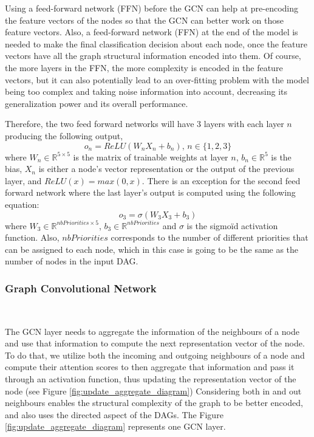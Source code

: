 Using a feed-forward network (FFN) before the GCN can help at pre-encoding the feature vectors of the nodes
so that the GCN can better work on those feature vectors.
Also, a feed-forward network (FFN) at the end of the model is needed to make 
the final classification decision about each node, once the feature vectors have
all the graph structural information encoded into them.
Of course, the more layers in the FFN, the more complexity
is encoded in the feature vectors, but it can also potentially lead to an over-fitting
problem with the model being too complex and taking noise information into account,
decreasing its generalization power and its overall performance.

Therefore, the two feed forward networks will have 3 layers with each 
layer $n$ producing the following output,
\begin{equation}
    o_{n} = ReLU(W_{n}X_{n} + b_n),\, n \in \{1,2,3\}
\end{equation}
where $W_n \in \mathbb{R}^{5\times5}$ is the matrix of trainable weights
at layer $n$, $b_n \in \mathbb{R}^5$ is the bias, $X_n$ is either a node's vector representation
or the output of the previous layer, and $ReLU(x) = max(0, x)$.
There is an exception for the second feed forward network where the last 
layer's output is computed using the following equation:
\begin{equation}
    o_{3} = \sigma(W_{3}X_{3} + b_3)
\end{equation}
where $W_3 \in \mathbb{R}^{nbPriorities \times 5}$,
$b_3 \in \mathbb{R}^{nbPriorities}$ and $\sigma$ is the 
sigmoïd activation function.
Also, $nbPriorities$ corresponds to the number of different priorities
that can be assigned to each node, which in this case is going to be the same as the number of nodes in the input DAG.


\subsubsection{Graph Convolutional Network}
~

The GCN layer needs to aggregate the information 
of the neighbours of a node and use that information
to compute the next representation vector of the node.
To do that, we utilize both the incoming and outgoing neighbours
of a node and compute their attention scores to then aggregate
that information and pass it through an activation 
function, thus updating the representation vector of the node (see Figure \ref{fig:update_aggregate_diagram})
Considering both in and out neighbours enables the structural complexity 
of the graph to be better encoded, and also
uses the directed aspect of the DAGs.
The Figure \ref{fig:update_aggregate_diagram} represents
one GCN layer.

